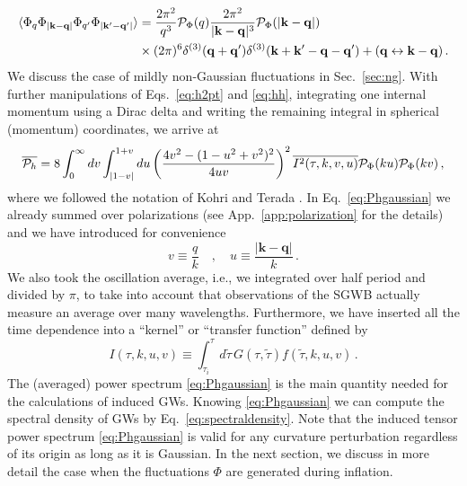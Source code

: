 \documentclass[a4paper,11pt]{article}
\numberwithin{equation}{section}
\begin{document}
\begin{align}\label{eq:gaussian}
\langle\Phi_q\Phi_{|\mathbf{k}-\mathbf{q}|}\Phi_{q'}\Phi_{|\mathbf{k}'-\mathbf{q}'|}\rangle&=\frac{2\pi^2}{q^3}{\cal P}_\Phi(q)\frac{2\pi^2}{|\mathbf{k}-\mathbf{q}|^3}{\cal P}_\Phi(|\mathbf{k}-\mathbf{q}|)\nonumber\\&\times(2\pi)^6\delta^{(3)}(\mathbf{q}+\mathbf{q}')\delta^{(3)}(\mathbf{k}+\mathbf{k}'-\mathbf{q}-\mathbf{q}')+(\mathbf{q}\leftrightarrow\mathbf{k}-\mathbf{q})\,.
\end{align}
We discuss the case of mildly non-Gaussian fluctuations in Sec.~\ref{sec:ng}.
With further manipulations of Eqs.~\eqref{eq:h2pt} and \eqref{eq:hh}, integrating one internal momentum using a Dirac delta and writing the remaining integral in spherical (momentum) coordinates, we arrive at
\begin{equation}\label{eq:Phgaussian}
\overline{{\cal P}_h}=8\int_0^\infty dv\int_{|1-v|}^{1+v}du\left(\frac{4v^2-(1-u^2+v^2)^2}{4uv}\right)^2\overline{I^2(\tau,k,v,u)}{{\cal P}_{\Phi}(ku)}{{\cal P}_{\Phi}(kv)}\,,
\end{equation}
where we followed the notation of Kohri and Terada \cite{Kohri:2018awv}. In Eq.~\eqref{eq:Phgaussian} we already summed over polarizations (see App.~\ref{app:polarization} for the details) and we have introduced for convenience
\begin{equation}\label{eq:uv}
v\equiv\frac{q}{k}\quad,\quad u\equiv\frac{|\mathbf{k}-\mathbf{q}|}{k}\,.
\end{equation}
We also took the oscillation average, i.e., we integrated over half period and divided by $\pi$, to take into account that observations of the SGWB actually measure an average over many wavelengths. Furthermore, we have inserted all the time dependence into a ``kernel'' or ``transfer function'' defined by
\begin{equation}\label{eq:kernelApp}
I(\tau,k,u,v)\equiv \int_{\tau_i}^{\tau}d\tilde\tau \,G(\tau,\tilde\tau)f(\tilde\tau,k,u,v)\,.
\end{equation}
The (averaged) power spectrum \eqref{eq:Phgaussian} is the main quantity needed for the calculations of induced GWs. Knowing \eqref{eq:Phgaussian} we can compute the spectral density of GWs by Eq.~\eqref{eq:spectraldensity}. Note that the induced tensor power spectrum \eqref{eq:Phgaussian} is valid for any curvature perturbation regardless of its origin as long as it is Gaussian. In the next section, we discuss in more detail the case when the fluctuations $\Phi$ are generated during inflation.
\end{document}
